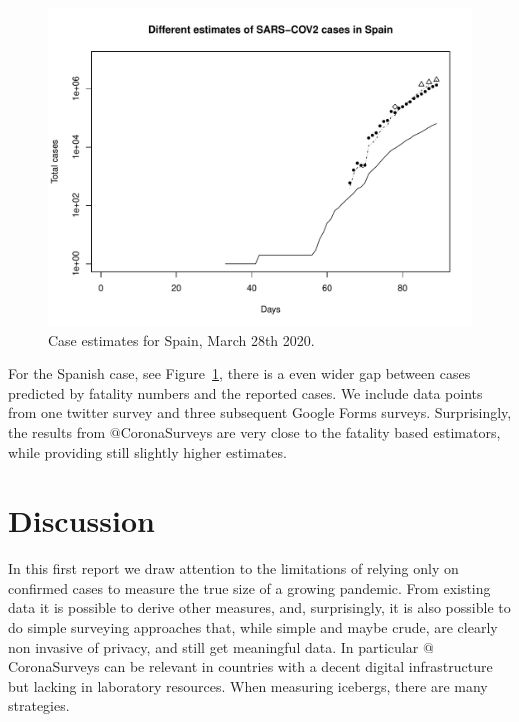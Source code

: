 \documentclass{article}
\begin{document}
\begin{figure}
\begin{center}
\includegraphics[width=.9\linewidth]{EstSPMar28.pdf}
\end{center}
\caption{Case estimates for Spain, March 28th 2020.}
\label{sp}
\end{figure}

For the Spanish case, see Figure~\ref{sp}, there is a even wider gap between cases predicted by fatality numbers and the reported cases. We include data points from one twitter survey and three subsequent Google Forms surveys. Surprisingly, the results from $@$CoronaSurveys are very close to the fatality based estimators, while providing still slightly higher estimates. 

\section{Discussion}

In this first report we draw attention to the limitations of relying only on confirmed cases to measure the true size of a growing pandemic. From existing data it is possible to derive other measures, and, surprisingly, it is also possible to do simple surveying approaches that, while simple and maybe crude, are clearly non invasive of privacy, and still get meaningful data. In particular  $@$CoronaSurveys can be relevant in countries with a decent digital infrastructure but lacking in laboratory resources. When measuring icebergs,  there are many strategies. 
\end{document}
